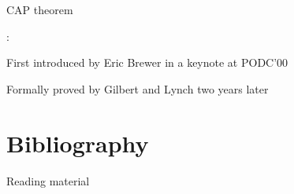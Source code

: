 \begin{frame}{CAP theorem}

:

\BIL
\item First introduced by Eric Brewer in a keynote at PODC'00
\BI
\item {\footnotesize {}}
\EI
\item Formally proved by Gilbert and Lynch two years later
\BI
\item {\footnotesize {}}
\EI
\EIL
\end{frame}


\section{Bibliography}

\begin{PlainFrame}{Reading material}

{\footnotesize
\BIL
\item {}
\item {}
\EIL
}


\end{PlainFrame}


